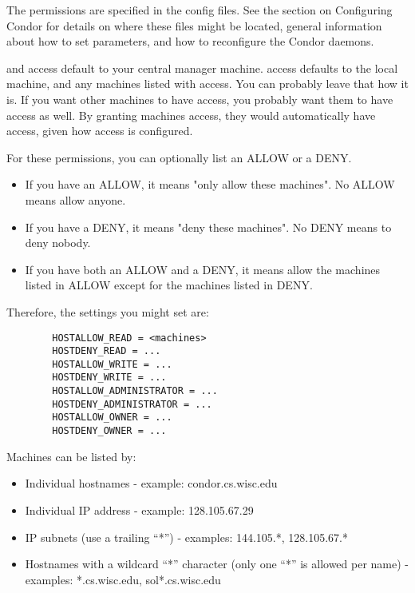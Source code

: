 The permissions are specified in the config files.  See the
section on Configuring Condor for details on where these files might
be located, general information about how to set parameters, and how
to reconfigure the Condor daemons.

 and  access default to 
your central manager machine.
 access defaults to the local machine, and any machines
listed with  access.  You can probably leave
that how it is.  If you want other machines to have 
access, you probably want them to have  access
as well.  By granting machines  access, they
would automatically have  access, given how
 access is configured.

For these permissions, you can optionally list an ALLOW or a DENY.
\begin{itemize}

\item If you have an ALLOW, it means "only allow these machines".  No
    ALLOW means allow anyone.

\item If you have a DENY, it means "deny these machines".  No DENY
    means to deny nobody.

\item If you have both an ALLOW and a DENY, it means allow the
    machines listed in ALLOW except for the machines listed in DENY.
\end{itemize}

Therefore, the settings you might set are:
\begin{verbatim}
        HOSTALLOW_READ = <machines>
        HOSTDENY_READ = ...
        HOSTALLOW_WRITE = ...
        HOSTDENY_WRITE = ...
        HOSTALLOW_ADMINISTRATOR = ...
        HOSTDENY_ADMINISTRATOR = ...
        HOSTALLOW_OWNER = ...
        HOSTDENY_OWNER = ...
\end{verbatim}

Machines can be listed by:

\begin{itemize}
\item Individual hostnames - example: condor.cs.wisc.edu
\item Individual IP address - example: 128.105.67.29
\item IP subnets (use a trailing ``*'') - examples: 144.105.*, 128.105.67.*
\item Hostnames with a wildcard ``*'' character (only one ``*'' is
    allowed per name) - examples: *.cs.wisc.edu, sol*.cs.wisc.edu
\end{itemize}

